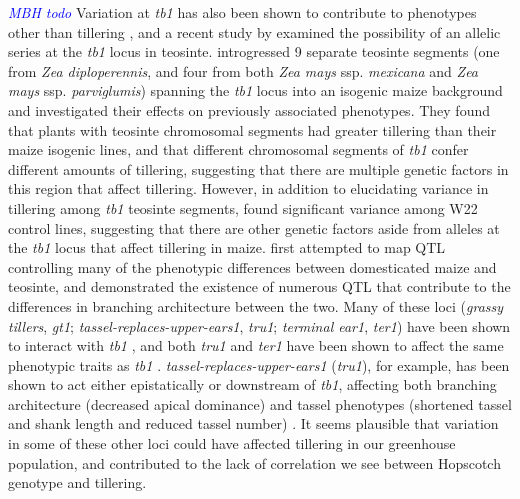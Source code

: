 \documentclass[12pt]{article}
\newcommand{\jri}[1]{\textcolor{blue}{ \emph{\scriptsize  #1}} }
\begin{document}
\jri{MBH todo} Variation at \emph{tb1} has also been shown to contribute to phenotypes other than tillering \citep{Clark2006}, and a recent study by \citet{StuderDoebley2012} examined the possibility of an allelic series at the \emph{tb1} locus in teosinte. \citet{StuderDoebley2012} introgressed 9 separate teosinte segments (one from \emph{Zea diploperennis}, and four from both \emph{Zea mays} ssp. \emph{mexicana} and \emph{Zea mays} ssp. \emph{parviglumis}) spanning the \emph{tb1} locus into an isogenic maize background and investigated their effects on previously associated phenotypes. They found that plants with teosinte chromosomal segments had greater tillering than their maize isogenic lines, and that different chromosomal segments of \emph{tb1} confer different amounts of tillering, suggesting that there are multiple genetic factors in this region that affect tillering. However, in addition to elucidating variance in tillering among \emph{tb1} teosinte segments, \citet{StuderDoebley2012} found significant variance among W22 control lines, suggesting that there are other genetic factors aside from alleles at the \emph{tb1} locus that affect tillering in maize. \citet{DoebleyStec1991, DoebleyStec1993} first attempted to map QTL controlling many of the phenotypic differences between domesticated maize and teosinte, and demonstrated the existence of numerous QTL that contribute to the differences in branching architecture between the two. Many of these loci (\emph{grassy tillers}, \emph{gt1}; \emph{tassel-replaces-upper-ears1}, \emph{tru1}; \emph{terminal ear1}, \emph{ter1}) have been shown to interact with \emph{tb1} \citep{Whipple2011, Li2012},  and both \emph{tru1} and \emph{ter1} have been shown to affect the same phenotypic traits as \emph{tb1} \citep{DoebleyStecGustus1995}. \emph{tassel-replaces-upper-ears1} (\emph{tru1}), for example, has been shown to act either epistatically or downstream of \emph{tb1}, affecting both branching architecture (decreased apical dominance) and tassel phenotypes (shortened tassel and shank length and reduced tassel number) \citep{Li2012}. It seems plausible that variation in some of these other loci could have affected tillering in our greenhouse population, and contributed to the lack of correlation we see between Hopscotch genotype and tillering. 
\end{document}

